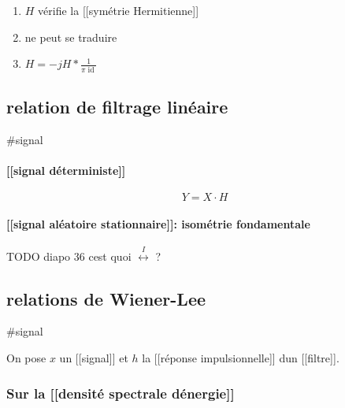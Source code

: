 \documentclass[
]{article}
\providecommand{\tightlist}{%
  \setlength{\itemsep}{0pt}\setlength{\parskip}{0pt}}
\begin{document}
\begin{enumerate}
\def\labelenumi{\arabic{enumi}.}
\tightlist
\item
  \(H\) vérifie la {[}{[}symétrie Hermitienne{]}{]}
\item
  ne peut se traduire
\item
  \(H = -jH \ast \frac{1}{\pi \operatorname{id}}\)
\end{enumerate}

\hypertarget{relation-de-filtrage-linuxe9aire}{%
\subsection{relation de filtrage
linéaire}\label{relation-de-filtrage-linuxe9aire}}

\#signal

\hypertarget{signal-duxe9terministe}{%
\paragraph{{[}{[}signal
déterministe{]}{]}}\label{signal-duxe9terministe}}

\[
Y = X \cdot H
\]

\hypertarget{signal-aluxe9atoire-stationnaire-isomuxe9trie-fondamentale}{%
\paragraph{{[}{[}signal aléatoire stationnaire{]}{]}: isométrie
fondamentale}\label{signal-aluxe9atoire-stationnaire-isomuxe9trie-fondamentale}}

TODO diapo 36 c\textquotesingle est quoi
\(\stackrel{I}{\leftrightarrow}\) ?

\hypertarget{relations-de-wiener-lee}{%
\subsection{relations de Wiener-Lee}\label{relations-de-wiener-lee}}

\#signal

On pose \(x\) un {[}{[}signal{]}{]} et \(h\) la {[}{[}réponse
impulsionnelle{]}{]} d\textquotesingle un {[}{[}filtre{]}{]}.

\hypertarget{sur-la-densituxe9-spectrale-duxe9nergie}{%
\subsubsection{Sur la {[}{[}densité spectrale
d\textquotesingle énergie{]}{]}}\label{sur-la-densituxe9-spectrale-duxe9nergie}}
\end{document}
